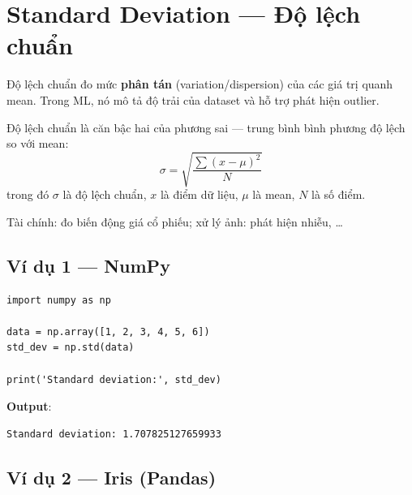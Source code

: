 \section{Standard Deviation --- Độ lệch chuẩn}
\label{sec:standard-deviation}

\begin{dinhnghia}[title={Standard deviation}]
Độ lệch chuẩn đo mức \textbf{phân tán} (variation/dispersion) của các giá trị quanh mean.
Trong ML, nó mô tả độ trải của dataset và hỗ trợ phát hiện outlier.
\end{dinhnghia}

\begin{ynghia}[title={Công thức}]
Độ lệch chuẩn là căn bậc hai của phương sai --- trung bình bình phương độ lệch so với mean:
\[
\sigma = \sqrt{\frac{\sum (x - \mu)^2}{N}}
\]
trong đó $\sigma$ là độ lệch chuẩn, $x$ là điểm dữ liệu, $\mu$ là mean, $N$ là số điểm.
\end{ynghia}

\begin{phuongphap}[title={Ứng dụng}]
Tài chính: đo biến động giá cổ phiếu; xử lý ảnh: phát hiện nhiễu, \ldots
\end{phuongphap}

\subsection{Ví dụ 1 --- NumPy}

\begin{vidu}[title={Độ lệch chuẩn mảng đơn giản}]
\begin{lstlisting}
import numpy as np

data = np.array([1, 2, 3, 4, 5, 6])
std_dev = np.std(data)

print('Standard deviation:', std_dev)
\end{lstlisting}

\textbf{Output}:
\begin{lstlisting}
Standard deviation: 1.707825127659933
\end{lstlisting}
\end{vidu}

\subsection{Ví dụ 2 --- Iris (Pandas)}

